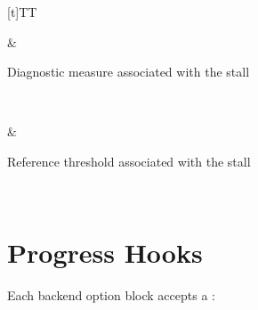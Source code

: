 \documentclass[letterpaper,10pt,english]{sphinxmanual}
\begin{document}
\begin{savenotes}
\begin{tabulary}{\linewidth}[t]{TT}
\begin{varwidth}[t]{}
\sphinxAtStartPar
{}
\sphinxbeforeendvarwidth
\end{varwidth}%
&\begin{varwidth}[t]{}
\sphinxAtStartPar
Diagnostic measure associated with the stall
\sphinxbeforeendvarwidth
\end{varwidth}%
\\
\sphinxhline\begin{varwidth}[t]{}
\sphinxAtStartPar
{}
\sphinxbeforeendvarwidth
\end{varwidth}%
&\begin{varwidth}[t]{}
\sphinxAtStartPar
Reference threshold associated with the stall
\sphinxbeforeendvarwidth
\end{varwidth}%
\\
\sphinxbottomrule
\end{tabulary}
\sphinxtableafterendhook\par
\sphinxattableend\end{savenotes}


\section{Progress Hooks}
\label{\detokenize{optima_algorithms:progress-hooks}}
\sphinxAtStartPar
Each backend option block accepts a :

\begin{sphinxVerbatim}[commandchars=\\\{\}]
\PYG{p}{[}\PYG{p}{]}
\end{sphinxVerbatim}
\end{document}
